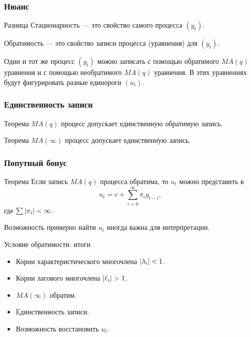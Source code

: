 \begin{frame}
    \frametitle{Нюанс}

    \begin{block}{Разница}
        Стационарность — это свойство самого процесса $(y_t)$.

        Обратимость — это свойство записи процесса (уравнения) для $(y_t)$.
    \end{block}

    \pause
    \alert{Один и тот же} процесс $(y_t)$ можно записать с помощью обратимого $MA(q)$ уравнения
    и с помощью необратимого $MA(q)$ уравнения. 
    \pause
    В этих уравнениях будут фигурировать разные единороги $(u_t)$.


\end{frame}

\begin{frame}
    \frametitle{Единственность записи}

    \begin{block}{Теорема}
        $MA(q)$ процесс допускает единственную обратимую запись. 
    \end{block}

    \pause
    \begin{block}{Теорема}
        $MA(\infty)$ процесс допускает единственную запись. 
    \end{block}    

\end{frame}

\begin{frame}
    \frametitle{Попутный бонус}

    \begin{block}{Теорема}
        Если запись $MA(q)$ процесса обратима, то $u_t$ можно представить в
        \[
            u_t = c + \sum_{i=0}^{\infty} \pi_i y_{t-i},
        \]
        где $\sum \abs{\pi_i} <\infty$.
    \end{block}
    
    \pause
    Возможность примерно найти $u_t$ иногда важна для интерпретации.

\end{frame}




\begin{frame}{Условие обратимости: итоги}

  \begin{itemize}[<+->]
    \item Корни характеристического многочлена $\abs{\lambda_i} < 1$. 
    \item Корни лагового многочлена $\abs{\ell_i} > 1$. 
    \item $MA(\infty)$ обратим.
    \item Единственность записи.
    \item Возможность восстановить $u_t$.
  \end{itemize}
\end{frame}



